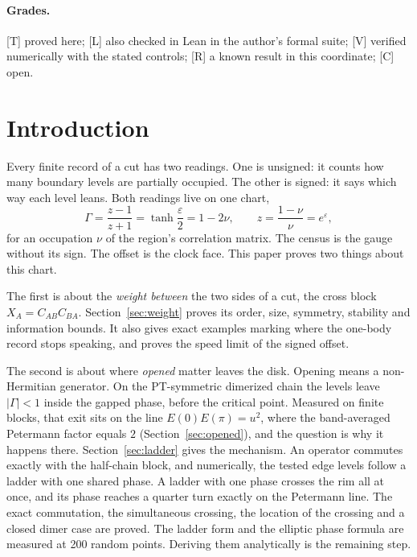\documentclass[11pt]{article}
\theoremstyle{definition}
\newcommand{\grade}[1]{\textsf{\small[#1]}}
\begin{document}
\paragraph{Grades.} \grade{T} proved here; \grade{L} also checked in Lean in the author's formal suite; \grade{V} verified numerically with the stated controls; \grade{R} a known result in this coordinate; \grade{C} open.

\section{Introduction}
Every finite record of a cut has two readings. One is unsigned: it counts how many boundary levels are partially occupied. The other is signed: it says which way each level leans. Both readings live on one chart,
\[
\Gamma=\frac{z-1}{z+1}=\tanh\frac{\varepsilon}{2}=1-2\nu,\qquad z=\frac{1-\nu}{\nu}=e^{\varepsilon},
\]
for an occupation $\nu$ of the region's correlation matrix. The census is the gauge without its sign. The offset is the clock face. This paper proves two things about this chart.

The first is about the \emph{weight between} the two sides of a cut, the cross block $X_A=C_{AB}C_{BA}$. Section~\ref{sec:weight} proves its order, size, symmetry, stability and information bounds. It also gives exact examples marking where the one-body record stops speaking, and proves the speed limit of the signed offset.

The second is about where \emph{opened} matter leaves the disk. Opening means a non-Hermitian generator. On the PT-symmetric dimerized chain the levels leave $|\Gamma|<1$ inside the gapped phase, before the critical point. Measured on finite blocks, that exit sits on the line $E(0)E(\pi)=u^2$, where the band-averaged Petermann factor equals $2$ (Section~\ref{sec:opened}), and the question is why it happens there. Section~\ref{sec:ladder} gives the mechanism. An operator commutes exactly with the half-chain block, and numerically, the tested edge levels follow a ladder with one shared phase. A ladder with one phase crosses the rim all at once, and its phase reaches a quarter turn exactly on the Petermann line. The exact commutation, the simultaneous crossing, the location of the crossing and a closed dimer case are proved. The ladder form and the elliptic phase formula are measured at 200 random points. Deriving them analytically is the remaining step.
\end{document}
